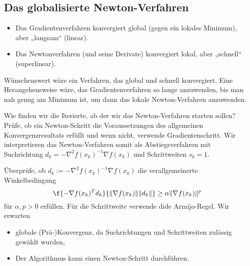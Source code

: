 \subsection{Das globalisierte Newton-Verfahren}

\begin{itemize}
	\item
		Das Gradientenverfahren konvergiert global (gegen ein lokales Minimum), aber „langsam“ (linear).
	\item
		Das Newtonverfahren (und seine Derivate) konvergiert lokal, aber „schnell“ (superlinear).
\end{itemize}
Wünschenswert wäre ein Verfahren, das global und schnell konvergiert.
Eine Herangehensweise wäre, das Gradientenverfahren so lange anzuwenden, bis man nah genug am Minimum ist, um dann das lokale Newton-Verfahren anzuwenden.

Wie finden wir die Iterierte, ab der wir das Newton-Verfahren starten sollen?
Prüfe, ob ein Newton-Schritt die Voraussetzungen des allgemeinen Konvergenzresultats erfüllt und wenn nicht, verwende Gradientenschritt.
Wir interpretieren das Newton-Verfahren somit als Abstiegsverfahren mit Suchrichtung $d_k = - \nabla^2 f(x_k)^{-1} \nabla f(x_k)$ und Schrittweiten $s_k = 1$.

Überprüfe, ob $d_k := -\nabla^2 f(x_k)^{-1} \nabla f(x_k)$ die verallgemeinerte Winkelbedingung
\[
	\f{-\nabla f(x_k)^T d_k}{\|\nabla f(x_k)\| \|d_k\|} \ge \alpha \|\nabla f(x_k)\|^p
\]
für $\alpha, p > 0$ erfüllen.
Für die Schrittweite verwende dide Armijo-Regel.
Wir erwarten
\begin{itemize}
	\item
		globale (Prä-)Konvergenz, da Suchrichtungen und Schrittweiten zulässig gewählt wurden,
	\item
		Der Algorithmus kann einen Newton-Schritt durchführen.
\end{itemize}

\begin{alg} \label{alg:8}
	\begin{algorithmic}
				\EndIf
			\Else
			\EndIf
			\Repeat
		\EndWhile
	\end{algorithmic}
\end{alg}


